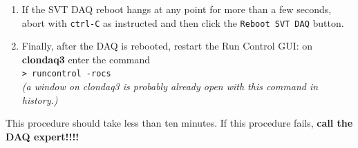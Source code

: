 \documentclass[letter,12pt]{article}
\begin{document}
\begin{enumerate}
\item 
\begin{minipage}[t]{0.35\textwidth}
If the SVT DAQ reboot hangs at any point for more than a few seconds, abort with \texttt{ctrl-C} as instructed and then click the \texttt{Reboot SVT DAQ} button.
\end{minipage}
\begin{minipage}[t]{0.4\textwidth}
\end{minipage}
\begin{minipage}[t]{0.15\textwidth}
\end{minipage}

\item Finally, after the DAQ is rebooted, restart the Run Control GUI: on \textbf{clondaq3} enter the command \\ 
\texttt{> runcontrol -rocs} \\
\textit{(a window on clondaq3 is probably already open with this command in history.)}\\
\end{enumerate}

This procedure should take less than ten minutes. If this procedure fails, \textbf{call the DAQ expert!!!!}
\end{document}
